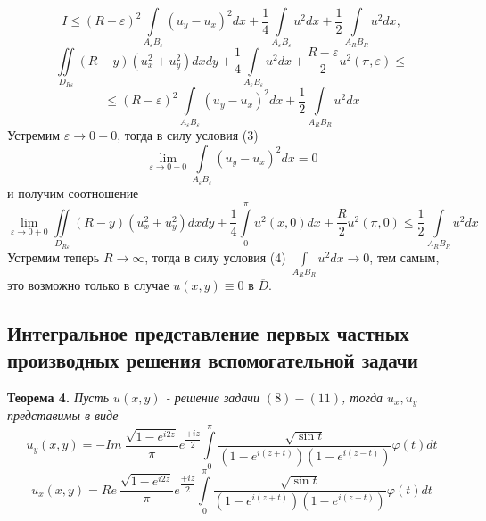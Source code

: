 \documentclass[12pt, a4paper]{article}
\begin{document}
	\begin{equation*}
		I \leq \left(R - \varepsilon\right)^2 \int\limits_{A_\varepsilon B_\varepsilon} \left( u_y - u_x\right)^2 dx + \dfrac14 \int\limits_{A_\varepsilon B_\varepsilon} u^2 dx +\dfrac12 \int\limits_{A_RB_R} u^2 dx, 
	\end{equation*}
	\begin{equation*}
		\iint\limits_{D_{R\varepsilon}} \left(R - y\right) \left(u_x^2 + u_y^2\right) dx dy + \dfrac{1}{4}\int\limits_{A_\varepsilon B_\varepsilon} u^2 dx +\dfrac{R - \varepsilon}{2}u^2(\pi, \varepsilon) \leq 
	\end{equation*}
	\begin{equation*}
		\leq \left(R - \varepsilon\right)^2 \int\limits_{A_\varepsilon B_\varepsilon} \left( u_y - u_x\right)^2 dx  +\dfrac12 \int\limits_{A_RB_R} u^2 dx
	\end{equation*}
	Устремим $\varepsilon \to 0 + 0$, тогда в силу условия (3)
	\begin{equation*}
		\lim\limits_{\varepsilon \to 0 + 0} \int\limits_{A_\varepsilon B_\varepsilon} \left(u_y - u_x\right)^2 dx = 0
	\end{equation*}
	и получим соотношение
	\begin{equation*}
		\lim\limits_{\varepsilon \to 0 + 0} \iint\limits_{D_{R\varepsilon}} \left(R - y\right) \left(u_x^2 + u_y^2 \right) dx dy + \dfrac14 \int\limits_0^\pi u^2(x,0) dx + \dfrac{R}{2}u^2(\pi,0) \leq \dfrac12 \int\limits_{A_RB_R} u^2 dx
	\end{equation*}
	Устремим теперь $R \to \infty$, тогда  в силу условия (4) $\int\limits_{A_RB_R} u^2 dx \to 0$, тем самым, это возможно только в случае $u(x,y) \equiv 0$ в $\overline{D}$.
\subsection{Интегральное представление первых частных производных решения вспомогательной задачи}
\textbf{Теорема 4.} \textit{	Пусть $u(x,y)$ - решение задачи $(8)-(11)$, тогда $u_x, u_y$ представимы в виде
	\begin{equation}
		u_y(x,y) = - Im\  \dfrac{ \sqrt{1 - e^{i2z}} }{\pi} e^{\dfrac{+iz}{2}} \int\limits_0^\pi  \dfrac{\sqrt{\sin{t}}}{\left(1 - e^{i(z+t)} \right) \left(1 - e^{i(z-t)}\right)}  \varphi(t) dt
	\end{equation}
	\begin{equation}
		u_x(x,y) = Re\   \dfrac{ \sqrt{1 - e^{i2z}} }{\pi} e^{\dfrac{+iz}{2}} \int\limits_0^\pi  \dfrac{\sqrt{\sin{t}}}{\left(1 - e^{i(z+t)} \right) \left(1 - e^{i(z-t)}\right)}  \varphi(t) dt
\end{equation}}
\end{document}
